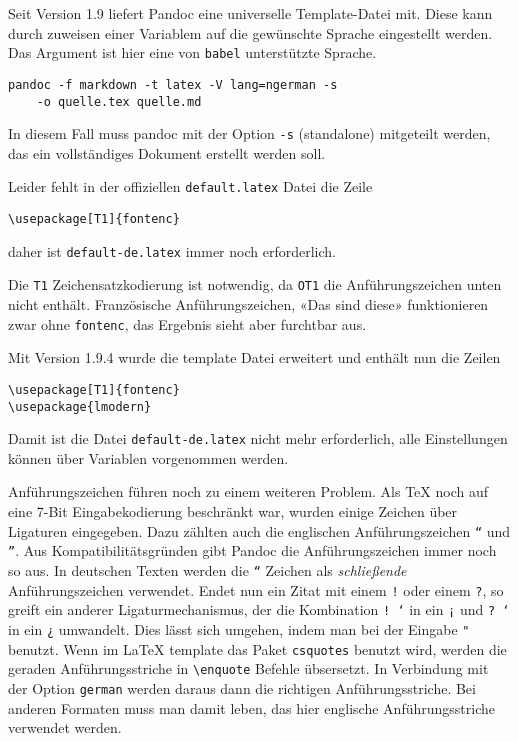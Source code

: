 \documentclass[11pt,ngerman,a4paper]{article}
\begin{document}
Seit Version 1.9 liefert Pandoc eine universelle Template-Datei mit.
Diese kann durch zuweisen einer Variablem auf die gewünschte Sprache
eingestellt werden. Das Argument ist hier eine von \texttt{babel}
unterstützte Sprache.

\begin{verbatim}
pandoc -f markdown -t latex -V lang=ngerman -s 
    -o quelle.tex quelle.md
\end{verbatim}

In diesem Fall muss pandoc mit der Option \texttt{-s} (standalone)
mitgeteilt werden, das ein vollständiges Dokument erstellt werden soll.

Leider fehlt in der offiziellen \texttt{default.latex} Datei die Zeile

\begin{verbatim}
\usepackage[T1]{fontenc}
\end{verbatim}

daher ist \texttt{default-de.latex} immer noch erforderlich.

Die \texttt{T1} Zeichensatzkodierung ist notwendig, da \texttt{OT1} die
Anführungszeichen unten nicht enthält. Französische Anführungszeichen,
«Das sind diese» funktionieren zwar ohne \texttt{fontenc}, das Ergebnis
sieht aber furchtbar aus.

Mit Version 1.9.4 wurde die template Datei erweitert und enthält nun die
Zeilen

\begin{verbatim}
\usepackage[T1]{fontenc}
\usepackage{lmodern}
\end{verbatim}

Damit ist die Datei \texttt{default-de.latex} nicht mehr erforderlich,
alle Einstellungen können über Variablen vorgenommen werden.

Anführungszeichen führen noch zu einem weiteren Problem. Als TeX noch
auf eine 7-Bit Eingabekodierung beschränkt war, wurden einige Zeichen
über Ligaturen eingegeben. Dazu zählten auch die englischen
Anführungszeichen \texttt{``} und \texttt{''}. Aus
Kompatibilitätsgründen gibt Pandoc die Anführungszeichen immer noch so
aus. In deutschen Texten werden die \texttt{``} Zeichen als
\emph{schließende} Anführungszeichen verwendet. Endet nun ein Zitat mit
einem \texttt{!} oder einem \texttt{?}, so greift ein anderer
Ligaturmechanismus, der die Kombination \texttt{! `} in ein \texttt{¡}
und \texttt{? `} in ein \texttt{¿} umwandelt. Dies lässt sich umgehen,
indem man bei der Eingabe \texttt{"} benutzt. Wenn im LaTeX template das
Paket \texttt{csquotes} benutzt wird, werden die geraden
Anführungsstriche in \texttt{\textbackslash{}enquote} Befehle
übsersetzt. In Verbindung mit der Option \texttt{german} werden daraus
dann die richtigen Anführungsstriche. Bei anderen Formaten muss man
damit leben, das hier englische Anführungsstriche verwendet werden.
\end{document}
